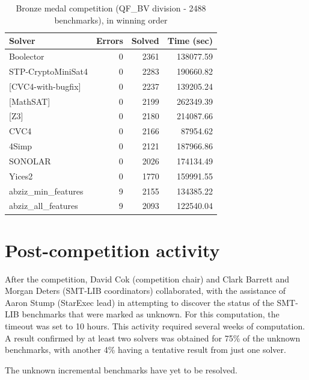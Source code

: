 \documentclass[twoside,11pt]{article}
\begin{document}
\begin{table}
\centering
\begin{tabular}{|l|rrr|}
\hline
 Solver & Errors & Solved & Time (sec)\\
\hline
Boolector &	0  &		2361  &		138077.59 \\
STP-CryptoMiniSat4 & 0  &		2283  &		190660.82 	\\
{[}CVC4-with-bugfix] &	0  &		2237 	 &		139205.24 \\
{[}MathSAT]  &	0  &		2199 	 &		262349.39 \\
{[}Z3]  & 	0  &		2180 	 &		214087.66 	\\
CVC4  &	0  &		2166 	 &		87954.62 	\\
4Simp &	0 &	2121 	 &		187966.86 \\
SONOLAR &	0  &		2026  &	 	174134.49 \\
Yices2 &	0  &		1770  &	 	159991.55 \\
abziz\_min\_features &	9  &		2155 	 &	 	134385.22 \\
abziz\_all\_features &	9  &		2093 	 &	 	122540.04 \\
\hline
\end{tabular}
\vspace{.2in}
\caption{Bronze medal competition (QF\_BV division - 2488 benchmarks), in winning order}
\label{Table:bronze}
\end{table}

\section{Post-competition activity}
\label{sec:post}
After the competition, David Cok (competition chair) and Clark Barrett and Morgan Deters (SMT-LIB coordinators) collaborated, with the assistance of Aaron Stump (StarExec lead) in attempting to discover the status of the SMT-LIB benchmarks that were marked as unknown. For this computation, the timeout was set to 10 hours. This activity required several weeks of computation. A result confirmed by at least two solvers was obtained for 75\% of the unknown benchmarks, with another 4\% having a tentative result from just one solver.

The unknown incremental benchmarks have yet to be resolved.
\end{document}
